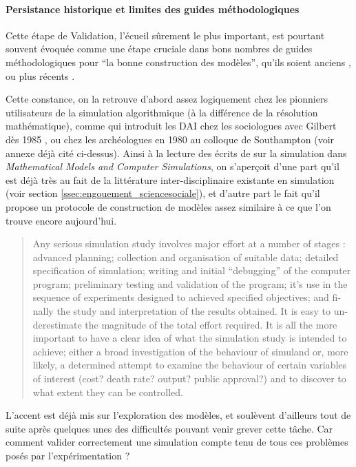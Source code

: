 \paragraph{Persistance historique et limites des guides méthodologiques}

Cette étape de Validation, l'écueil sûrement le plus important, est pourtant souvent évoquée comme une étape cruciale dans bons nombres de guides méthodologiques pour \enquote{la bonne construction des modèles}, qu'ils soient anciens \autocites[195]{Beshers1965}{Guetzkow1972, Dutton1971,Naylor1966, Naylor1967}, ou plus récents \autocite{Amblard2006, Gilbert2008}.

Cette constance, on la retrouve d'abord assez logiquement chez les pionniers utilisateurs de la simulation algorithmique (à la différence de la résolution mathématique), comme \textcite{Doran1975, Doran1986} qui introduit les DAI chez les sociologues avec Gilbert dès 1985 \autocite{Gilbert1985}, ou chez les archéologues en 1980 au colloque de Southampton \autocites{Doran1982, Renfrew1982} (voir annexe déjà cité ci-dessus). Ainsi à la lecture des écrits de \textcite[300-301]{Doran1975} sur la simulation dans \textit{Mathematical Models and Computer Simulations}, on s'aperçoit d'une part qu'il est déjà très au fait de la littérature inter-disciplinaire existante en simulation \autocite{Guetzkow1972} (voir section \ref{ssec:engouement_sciencesociale}), et d'autre part le fait qu'il propose un protocole de construction de modèles assez similaire à ce que l'on trouve encore aujourd'hui. 

\foreignblockquote{english}[\cite{Guetzkow1972}]{Any serious simulation study involves major effort at a number of stages : advanced planning; collection and organisation of suitable data; detailed specification of simulation; writing and initial \enquote{debugging} of the computer program; preliminary testing and validation of the program; it's use in the sequence of experiments designed to achieved specified objectives; and finally the study and interpretation of the results obtained. It is easy to underestimate the magnitude of the total effort required. It is all the more important to have a clear idea of what the simulation study is intended to achieve; either a broad investigation of the behaviour of simuland  or, more likely, a determined attempt to examine the behaviour of certain variables of interest (cost? death rate? output? public approval?) and to discover to what extent they can be controlled.} 

L'accent est déjà mis sur l'exploration des modèles, et \textcite[301]{Doran1975} soulèvent d'ailleurs tout de suite après quelques unes des difficultés pouvant venir grever cette tâche. Car comment valider correctement une simulation compte tenu de tous ces problèmes posés par l'expérimentation ? 

